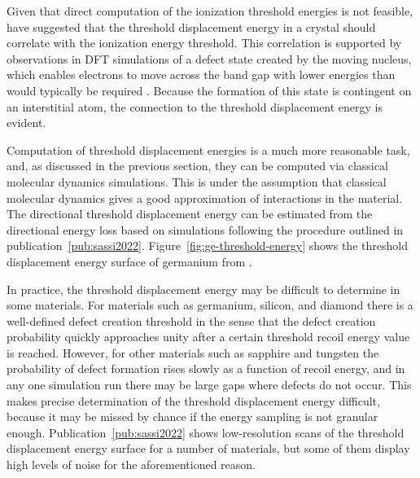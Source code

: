 \documentclass[b5paper, 10pt, twoside]{book}
\begin{document}
Given that direct computation of the ionization threshold energies is not feasible, \textcite{KadribasicEtAl2018} have suggested that the threshold displacement energy in a crystal should correlate with the ionization energy threshold. This correlation is supported by observations in DFT simulations of a defect state created by the moving nucleus, which enables electrons to move across the band gap with lower energies than would typically be required \parencite{LimEtAl2016}. Because the formation of this state is contingent on an interstitial atom, the connection to the threshold displacement energy is evident.

Computation of threshold displacement energies is a much more reasonable task, and, as discussed in the previous section, they can be computed via classical molecular dynamics simulations. This is under the assumption that classical molecular dynamics gives a good approximation of interactions in the material. The directional threshold displacement energy can be estimated from the directional energy loss based on simulations following the procedure outlined in publication~\ref{pub:sassi2022}. Figure~\ref{fig:ge-threshold-energy} shows the threshold displacement energy surface of germanium from \textcite{KadribasicEtAl2018}. 

In practice, the threshold displacement energy may be difficult to determine in some materials. For materials such as germanium, silicon, and diamond there is a well-defined defect creation threshold in the sense that the defect creation probability quickly approaches unity after a certain threshold recoil energy value is reached. However, for other materials such as sapphire and tungsten the probability of defect formation rises slowly as a function of recoil energy, and in any one simulation run there may be large gaps where defects do not occur. This makes precise determination of the threshold displacement energy difficult, because it may be missed by chance if the energy sampling is not granular enough. Publication~\ref{pub:sassi2022} shows low-resolution scans of the threshold displacement energy surface for a number of materials, but some of them display high levels of noise for the aforementioned reason.
\end{document}
